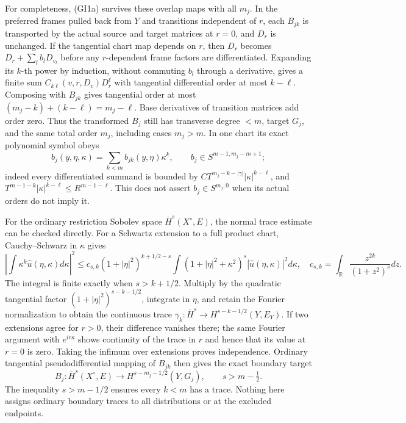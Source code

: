 \documentclass[
  11pt,
]{article}
\begin{document}
For completeness, (GI1a) survives these overlap maps with all \(m_j\).
In the preferred frames pulled back from \(Y\) and transitions
independent of \(r\), each \(B_{jk}\) is transported by the actual
source and target matrices at \(r=0\), and \(D_r\) is unchanged. If the
tangential chart map depends on \(r\), then \(D_r\) becomes
\(D_r+\sum_l b_lD_{v_l}\) before any \(r\)-dependent frame factors are
differentiated. Expanding its \(k\)-th power by induction, without
commuting \(b_l\) through a derivative, gives a finite sum
\(C_{k\ell}(v,r,D_v)D_r^\ell\) with tangential differential order at
most \(k-\ell\). Composing with \(B_{jk}\) gives tangential order at
most \((m_j-k)+(k-\ell)=m_j-\ell\). Base derivatives of transition
matrices add order zero. Thus the transformed \(B_j\) still has
transverse degree \(<m\), target \(G_j\), and the same total order
\(m_j\), including cases \(m_j>m\). In one chart its exact polynomial
symbol obeys \[
 b_j(y,\eta,\kappa)=\sum_{k<m}b_{jk}(y,\eta)\kappa^k,
 \qquad b_j\in S^{m-1,m_j-m+1};
 \tag{GI36a}
\] indeed every differentiated summand is bounded by
\(C T^{m_j-k-|\gamma|}|\kappa|^{k-\ell}\), and
\(T^{m-1-k}|\kappa|^{k-\ell}\leq R^{m-1-\ell}\). This does not assert
\(b_j\in S^{m_j,0}\) when its actual orders do not imply it.

For the ordinary restriction Sobolev space \(\overline H^s(X^\circ,E)\),
the normal trace estimate can be checked directly. For a Schwartz
extension to a full product chart, Cauchy--Schwarz in \(\kappa\) gives
\[
 \left|\int\kappa^k\widehat u(\eta,\kappa)d\kappa\right|^2
 \leq c_{s,k}(1+|\eta|^2)^{k+1/2-s}
 \int(1+|\eta|^2+\kappa^2)^s|\widehat u(\eta,\kappa)|^2d\kappa,
 \quad
 c_{s,k}=\int_{\mathbb R}\frac{z^{2k}}{(1+z^2)^s}dz.
 \tag{GI36b}
\] The integral is finite exactly when \(s>k+1/2\). Multiply by the
quadratic tangential factor \((1+|\eta|^2)^{s-k-1/2}\), integrate in
\(\eta\), and retain the Fourier normalization to obtain the continuous
trace \(\gamma_k:\overline H^s\to H^{s-k-1/2}(Y,E_Y)\). If two
extensions agree for \(r>0\), their difference vanishes there; the same
Fourier argument with \(e^{ir\kappa}\) shows continuity of the trace in
\(r\) and hence that its value at \(r=0\) is zero. Taking the infimum
over extensions proves independence. Ordinary tangential
pseudodifferential mapping of \(B_{jk}\) then gives the exact boundary
target \[
 B_j:\overline H^s(X^\circ,E)\longrightarrow
 H^{s-m_j-1/2}(Y,G_j),\qquad s>m-\tfrac12.
 \tag{GI36c}
\] The inequality \(s>m-1/2\) ensures every \(k<m\) has a trace. Nothing
here assigns ordinary boundary traces to all distributions or at the
excluded endpoints.
\end{document}
